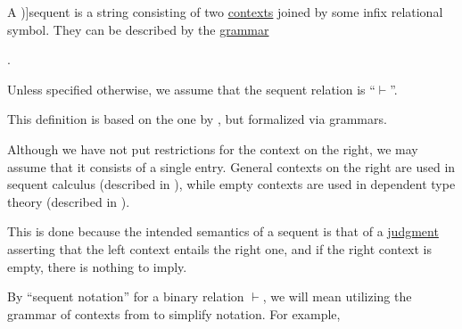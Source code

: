 \begin{definition}\label{def:sequent}\mimprovised
  A \term[ru=секвенция (\cite[49]{Герасимов2011Вычислимость})]{sequent} is a string consisting of two \hyperref[def:logical_context]{contexts} joined by some infix relational symbol. They can be described by the \hyperref[def:formal_grammar]{grammar}
  \begin{bnf*}
     { \bnfsp {} \bnfsp {}}.
  \end{bnf*}

  Unless specified otherwise, we assume that the sequent relation is \enquote{\( \vdash \)}.
\end{definition}
\begin{comments}
  \item This definition is based on the one by , but formalized via grammars.
  \item Although we have not put restrictions for the context on the right, we may assume that it consists of a single entry. General contexts on the right are used in sequent calculus (described in \cite[sec. 2.6]{Mimram2020Types}), while empty contexts are used in dependent type theory (described in \cite[ch. 8]{Mimram2020Types}).

  This is done because the intended semantics of a sequent is that of a \hyperref[con:judgment]{judgment} asserting that the left context entails the right one, and if the right context is empty, there is nothing to imply.
\end{comments}

\begin{remark}\label{rem:sequent_notation}
  By \enquote{sequent notation} for a binary relation \( \vdash \), we will mean utilizing the grammar of contexts from  to simplify notation. For example,
\end{remark}

